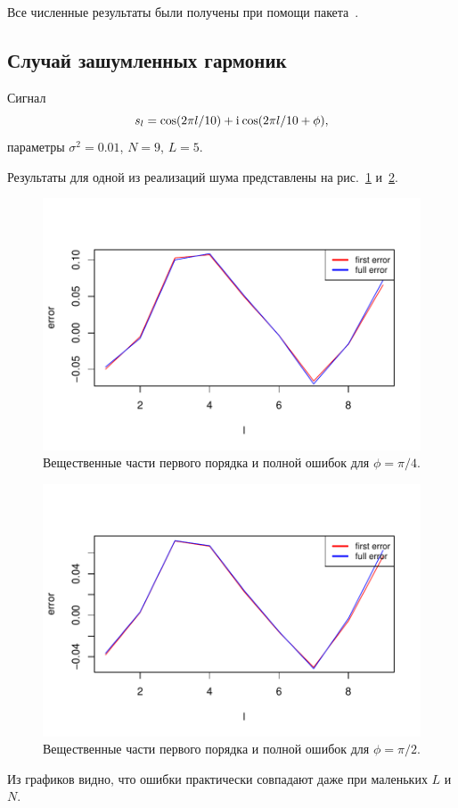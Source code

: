 \documentclass[specialist,
               substylefile = spbu.rtx,
               subf,href,colorlinks=true, 12pt]{disser}
\begin{document}
Все численные результаты были получены при помощи пакета~\cite{Korobeynikov.etal2014}.

\subsection{Случай зашумленных гармоник}
Сигнал
$$s_l = \cos(2 \pi l / 10) + \mathrm{i}\mkern1mu\cos(2 \pi l / 10 + \phi),$$
параметры $\sigma^2 = 0.01$, $N = 9$, $L = 5$.

Результаты для одной из реализаций шума представлены на рис.~\ref{fig:harm_noise_pi_4} и~\ref{fig:harm_noise_pi_2}.

\begin{figure}[H]
	\begin{center}
		\includegraphics[width=0.6\linewidth]{img/first_vs_full_re.pdf}
		\caption{Вещественные части первого порядка и полной ошибок для $\phi = \pi / 4$.}
		\label{fig:harm_noise_pi_4}
	\end{center}
\end{figure}

\begin{figure}[H]
	\begin{center}
		\includegraphics[width=0.6\linewidth]{img/first_vs_full_re_2.pdf}
		\caption{Вещественные части первого порядка и полной ошибок для $\phi = \pi / 2$.}
		\label{fig:harm_noise_pi_2}
	\end{center}
\end{figure}


Из графиков видно, что ошибки практически совпадают даже при маленьких $L$ и $N$.
\end{document}
